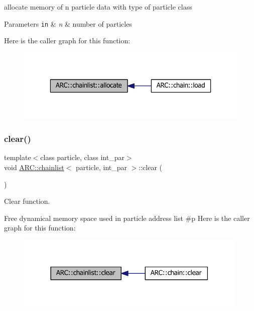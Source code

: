 allocate memory of n particle data with type of particle class 
\begin{DoxyParams}[1]{Parameters}
\mbox{\tt in}  & {\em n} & number of particles \\
\hline
\end{DoxyParams}
Here is the caller graph for this function\+:
\nopagebreak
\begin{figure}[H]
\begin{center}
\leavevmode
\includegraphics[width=323pt]{classARC_1_1chainlist_a79dfad1e9aeafcee55a28983f8eaffbe_icgraph}
\end{center}
\end{figure}
\hypertarget{classARC_1_1chainlist_aab62ed0d66f6dc32dce748d374c7f540}{}\label{classARC_1_1chainlist_aab62ed0d66f6dc32dce748d374c7f540} 
\subsubsection{\texorpdfstring{clear()}{clear()}}
{\footnotesize\ttfamily template$<$class particle, class int\+\_\+par$>$ \\
void \hyperlink{classARC_1_1chainlist}{A\+R\+C\+::chainlist}$<$ particle, int\+\_\+par $>$\+::clear (\begin{DoxyParamCaption}{ }\end{DoxyParamCaption})\hspace{0.3cm}{\ttfamily [inline]}}



Clear function. 

Free dynamical memory space used in particle address list \#p Here is the caller graph for this function\+:
\nopagebreak
\begin{figure}[H]
\begin{center}
\leavevmode
\includegraphics[width=314pt]{classARC_1_1chainlist_aab62ed0d66f6dc32dce748d374c7f540_icgraph}
\end{center}
\end{figure}
\hypertarget{classARC_1_1chainlist_aee6dffa94abf22c8f5bc120f5a1fecbd}{}\label{classARC_1_1chainlist_aee6dffa94abf22c8f5bc120f5a1fecbd} 
